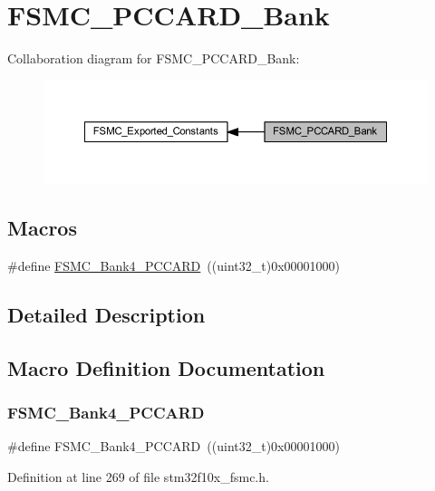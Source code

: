 \hypertarget{group___f_s_m_c___p_c_c_a_r_d___bank}{}\section{F\+S\+M\+C\+\_\+\+P\+C\+C\+A\+R\+D\+\_\+\+Bank}
\label{group___f_s_m_c___p_c_c_a_r_d___bank}
Collaboration diagram for F\+S\+M\+C\+\_\+\+P\+C\+C\+A\+R\+D\+\_\+\+Bank\+:
\nopagebreak
\begin{figure}[H]
\begin{center}
\leavevmode
\includegraphics[width=350pt]{group___f_s_m_c___p_c_c_a_r_d___bank}
\end{center}
\end{figure}
\subsection*{Macros}
\begin{DoxyCompactItemize}
\item 
\#define \hyperlink{group___f_s_m_c___p_c_c_a_r_d___bank_gad08ce7c7afc462f3d9ef085b05d42387}{F\+S\+M\+C\+\_\+\+Bank4\+\_\+\+P\+C\+C\+A\+RD}~((uint32\+\_\+t)0x00001000)
\end{DoxyCompactItemize}


\subsection{Detailed Description}


\subsection{Macro Definition Documentation}
\mbox{\label{group___f_s_m_c___p_c_c_a_r_d___bank_gad08ce7c7afc462f3d9ef085b05d42387}} 
\subsubsection{\texorpdfstring{F\+S\+M\+C\+\_\+\+Bank4\+\_\+\+P\+C\+C\+A\+RD}{FSMC\_Bank4\_PCCARD}}
{\footnotesize\ttfamily \#define F\+S\+M\+C\+\_\+\+Bank4\+\_\+\+P\+C\+C\+A\+RD~((uint32\+\_\+t)0x00001000)}



Definition at line 269 of file stm32f10x\+\_\+fsmc.\+h.

